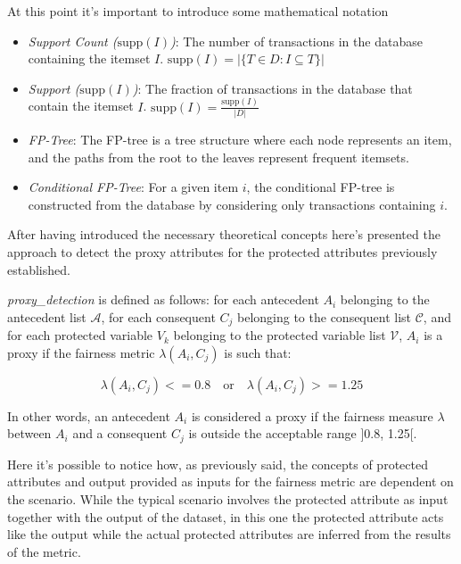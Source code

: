 \documentclass[12pt,a4paper,openright,twoside]{book}
\begin{document}
\begin{enumerate}
\begin{itemize}
        \end{itemize}

        At this point it's important to introduce some mathematical notation

        \begin{itemize}

            \item \emph{Support Count ($\text{supp}(I)$)}: The number of transactions in the database containing the itemset $I$. $\text{supp}(I) = |\{T \in D : I \subseteq T\}|$ 

            \item \emph{Support ($\text{supp}(I)$)}: The fraction of transactions in the database that contain the itemset $I$. $\text{supp}(I) = \frac{\text{supp}(I)}{|D|}$

            \item \emph{FP-Tree}: The FP-tree is a tree structure where each node represents an item, and the paths from the root to the leaves represent frequent itemsets.

            \item \emph{Conditional FP-Tree}: For a given item $i$, the conditional FP-tree is constructed from the database by considering only transactions containing $i$.

        \end{itemize}

\end{enumerate}

After having introduced the necessary theoretical concepts here's presented the approach to detect the proxy attributes for the protected attributes previously established.

\textit{proxy\_detection} is defined as follows: for each antecedent \( A_i \) belonging to the antecedent list \( \mathcal{A} \), for each consequent \( C_j \) belonging to the consequent list \( \mathcal{C} \), and for each protected variable \( V_k \) belonging to the protected variable list \( \mathcal{V} \), \( A_i \) is a proxy if the fairness metric \( \lambda(A_i, C_j) \) is such that:

\[\lambda(A_i, C_j) <= 0.8 \quad \text{or} \quad \lambda(A_i, C_j) >= 1.25\]

In other words, an antecedent \( A_i \) is considered a proxy if the fairness measure \( \lambda \) between \( A_i \) and a consequent \( C_j \) is outside the acceptable range ]0.8, 1.25[.

Here it's possible to notice how, as previously said, the concepts of protected attributes and output provided as inputs for the fairness metric are dependent on the scenario. While the typical scenario involves the protected attribute as input together with the output of the dataset, in this one the protected attribute acts like the output while the actual protected attributes are inferred from the results of the metric.
\end{document}
